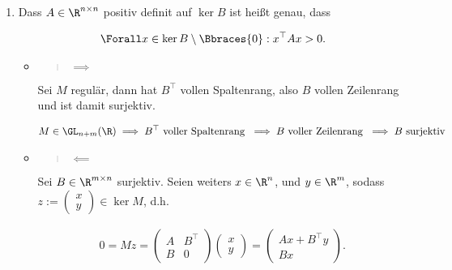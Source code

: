 \begin{solution}
\begin{enumerate}[label = \textbf{\alph*)}]
  \begin{comment}

    \item Let $B$ be regular, then the $m$ lower rows of $M$ must be linearly independent,
    which implies $\ran(B) = \R^m$. \\
    Conversely, suppose $M\cdot x = 0$ for $x \neq 0$. This implies $(x_1,\dots,x_n) \in \ker(B)$.
    Since $A$ is positive definite on $\ker$

  \end{comment}

  \item Dass $A \in \R^{n \times n}$ positiv definit auf $\ker B$ ist heißt genau, dass

  \begin{align*}
    \Forall x \in \ker B \setminus \Bbraces{0}:
      x^\top A x > 0.
  \end{align*}

  \begin{itemize}

    \item \blockquote{$\implies$}:

    Sei $M$ regulär, dann hat $B^\top$ vollen Spaltenrang, also $B$ vollen Zeilenrang und ist damit surjektiv.

    \begin{align*}
      M \in \GL_{n+m}(\R)
      \implies
      B^\top ~\text{voller Spaltenrang}~
      \implies
      B ~\text{voller Zeilenrang}~
      \implies
      B ~\text{surjektiv}
    \end{align*}

    \item \blockquote{$\impliedby$}:

    Sei $B \in \R^{m \times n}$ surjektiv.
    Seien weiters $x \in \R^n$, und $y \in \R^m$, sodass $z := \begin{pmatrix} x \\ y \end{pmatrix} \in \ker M$, d.h.

    \begin{align*}
      0
      =
      M z
      =
      \begin{pmatrix}
        A & B^\top \\
        B & 0
      \end{pmatrix}
      \begin{pmatrix}
        x \\ y
      \end{pmatrix}
      =
      \begin{pmatrix}
        A x + B^\top y \\
        B x
      \end{pmatrix}.
    \end{align*}


\end{itemize}
\end{enumerate}
\end{solution}
